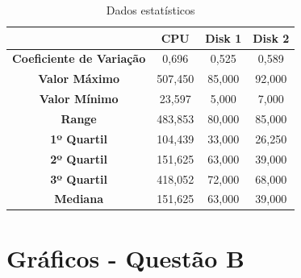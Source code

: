 \documentclass[11pt,a4paper,openany,oneside]{abntex2}
\begin{document}
\begin{table}[htbp]
	\caption{Dados  estatísticos}
	\centering
	\begin{tabular}{|c|c|c|c|}
		\hline
		& \textbf{CPU} & \textbf{Disk 1} & \textbf{Disk 2} \\ \hline
		\hline
		\textbf{Coeficiente de Variação} & 0,696 & 0,525 & 0,589 \\ \hline
		\textbf{Valor Máximo} & 507,450 & 85,000 & 92,000 \\ \hline
		\textbf{Valor Mínimo} & 23,597 & 5,000 & 7,000 \\ \hline
		\textbf{Range} & 483,853 & 80,000 & 85,000 \\ \hline
		\textbf{1º Quartil} & 104,439 & 33,000 & 26,250 \\ \hline
		\textbf{2º Quartil} & 151,625 & 63,000 & 39,000 \\ \hline
		\textbf{3º Quartil} & 418,052 & 72,000 & 68,000 \\ \hline
		\textbf{Mediana} & 151,625 & 63,000 & 39,000 \\ \hline
	\end{tabular}
	\label{tab:dadosestat}
\end{table}


\chapter{Gráficos - Questão B}
\label{qb}
\end{document}
